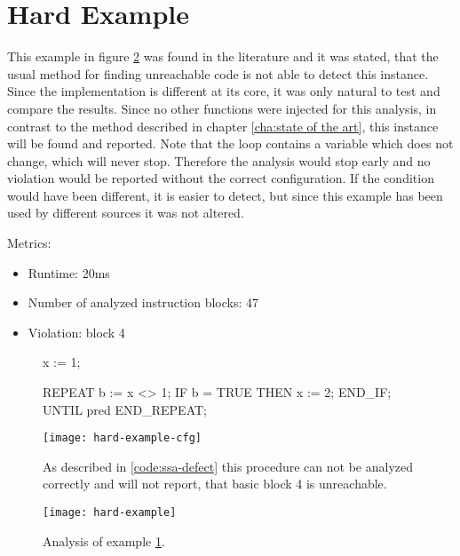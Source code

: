 \section{Hard Example}
This example in figure \ref{code:hard example 1} was found in the literature \cite{Click_1995} and it was stated, that the usual method for finding unreachable code is not able to detect this instance. 
Since the implementation is different at its core, it was only natural to test and compare the results.
Since no other functions were injected for this analysis, in contrast to the method described in chapter \ref{cha:state of the art}, this instance will be found and reported.
Note that the loop contains a variable which does not change, which will never stop. Therefore the analysis would stop early and no violation would be reported without the correct configuration. 
If the condition would have been different, it is easier to detect, but since this example has been used by different sources it was not altered.


Metrics:
\begin{itemize}
	\item Runtime: 20ms
	\item Number of analyzed instruction blocks: 47
	\item Violation: block 4
\end{itemize}

\begin{figure}[h!]
	\begin{GenericCode}
	x := 1;
	
	REPEAT
		b := x <> 1;
		IF b = TRUE THEN
			x := 2;
		END_IF;    
	UNTIL pred
	END_REPEAT;	\end{GenericCode}
	\centering
	\texttt{[image: hard-example-cfg]}
	\caption{As described in \ref{code:ssa-defect} this procedure can not be analyzed correctly and will not report, that basic block 4 is unreachable. }
	\label{code:hard example 1 cfg}
\end{figure}
\begin{figure}[h!]
	\centering
	\texttt{[image: hard-example]}
	\caption{Analysis of example \ref{code:hard example 1 cfg}.}
	\label{code:hard example 1}
\end{figure}


